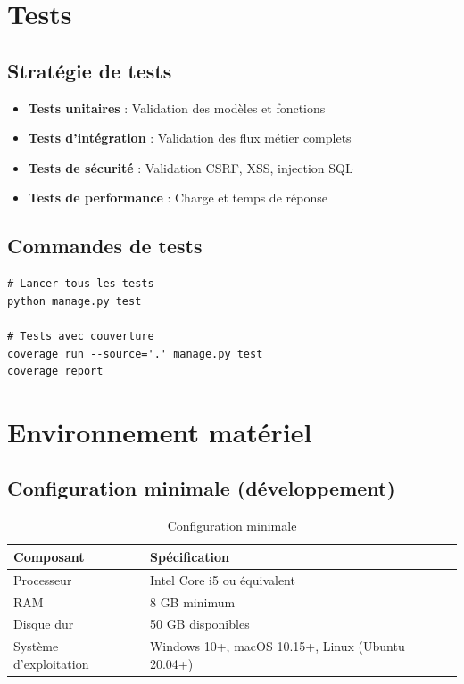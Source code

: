 \documentclass[12pt,a4paper]{report}
\begin{document}
\section{Tests}

\subsection{Stratégie de tests}
\begin{itemize}[leftmargin=1.5cm]
    \item \textbf{Tests unitaires} : Validation des modèles et fonctions
    \item \textbf{Tests d'intégration} : Validation des flux métier complets
    \item \textbf{Tests de sécurité} : Validation CSRF, XSS, injection SQL
    \item \textbf{Tests de performance} : Charge et temps de réponse
\end{itemize}

\subsection{Commandes de tests}
\begin{verbatim}
# Lancer tous les tests
python manage.py test

# Tests avec couverture
coverage run --source='.' manage.py test
coverage report
\end{verbatim}

\section{Environnement matériel}

\subsection{Configuration minimale (développement)}
\begin{table}[H]
\centering
\begin{tabular}{|p{5cm}|p{9cm}|}
\hline
\rowcolor{banquiseblue!30}
\textbf{Composant} & \textbf{Spécification} \\
\hline
Processeur & Intel Core i5 ou équivalent \\
\hline
RAM & 8 GB minimum \\
\hline
Disque dur & 50 GB disponibles \\
\hline
Système d'exploitation & Windows 10+, macOS 10.15+, Linux (Ubuntu 20.04+) \\
\hline
\end{tabular}
\caption{Configuration minimale}
\end{table}
\end{document}
